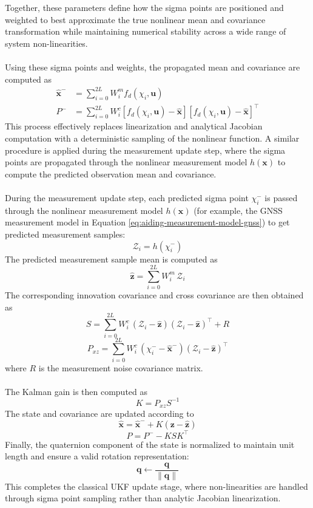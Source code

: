 \\ \\  
Together, these parameters define how the sigma points are positioned and weighted to best approximate the true nonlinear mean and covariance transformation while maintaining numerical stability across a wide range of system non-linearities. 
\\ \\  
Using these sigma points and weights, the propagated mean and covariance are computed as
$$
\begin{aligned}
    \hat{\mathbf{x}}^- &= \sum_{i=0}^{2L} W_i^m f_d(\chi_i, \mathbf{u}) \\
    P^- &= \sum_{i=0}^{2L} W_i^c [f_d(\chi_i, \mathbf{u}) - \hat{\mathbf{x}}][f_d(\chi_i, \mathbf{u}) - \hat{\mathbf{x}}]^\top
\end{aligned}
$$
This process effectively replaces linearization and analytical Jacobian computation with a deterministic sampling of the nonlinear function. A similar procedure is applied during the measurement update step, where the sigma points are propagated through the nonlinear measurement model $h(\mathbf{x})$ to compute the predicted observation mean and covariance.
\\ \\
During the measurement update step, each predicted sigma point $\chi_i^-$ is passed through the nonlinear measurement model $h(\mathbf{x})$ (for example, the GNSS measurement model in Equation \ref{eq:aiding-measurement-model-gnss}) to get predicted measurement samples:
$$
    \mathcal{Z}_i = h(\chi_i^-)
$$
The predicted measurement sample mean is computed as
$$
    \hat{\mathbf{z}} = \sum_{i=0}^{2L} W_i^m \, \mathcal{Z}_i
$$
The corresponding innovation covariance and cross covariance are then obtained as
$$
    S = \sum_{i=0}^{2L} W_i^c \, (\mathcal{Z}_i - \hat{\mathbf{z}})(\mathcal{Z}_i - \hat{\mathbf{z}})^\top + R
$$
$$
    P_{xz} = \sum_{i=0}^{2L} W_i^c \, (\chi_i^- - \hat{\mathbf{x}}^-)(\mathcal{Z}_i - \hat{\mathbf{z}})^\top
$$
where $R$ is the measurement noise covariance matrix.  
\\ \\
The Kalman gain is then computed as
$$
    K = P_{xz} S^{-1}
$$
The state and covariance are updated according to
$$
    \hat{\mathbf{x}} = \hat{\mathbf{x}}^- + K(\mathbf{z} - \hat{\mathbf{z}})
$$
$$
    P = P^- - K S K^\top
$$
Finally, the quaternion component of the state is normalized to maintain unit length and ensure a valid rotation representation:
$$
    \mathbf{q} \leftarrow \frac{\mathbf{q}}{\|\mathbf{q}\|}
$$
This completes the classical UKF update stage, where non-linearities are handled through sigma point sampling rather than analytic Jacobian linearization.




